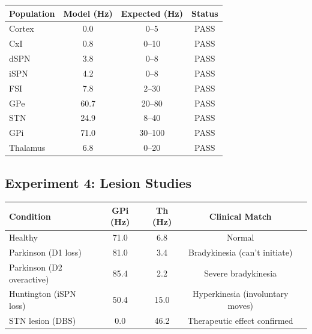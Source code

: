 \documentclass[11pt,a4paper]{article}
\begin{document}
\begin{table}[h]
\centering
\begin{tabular}{lccc}
\toprule
Population & Model (Hz) & Expected (Hz) & Status \\
\midrule
Cortex & 0.0 & 0--5 & PASS \\
CxI & 0.8 & 0--10 & PASS \\
dSPN & 3.8 & 0--8 & PASS \\
iSPN & 4.2 & 0--8 & PASS \\
FSI & 7.8 & 2--30 & PASS \\
GPe & 60.7 & 20--80 & PASS \\
STN & 24.9 & 8--40 & PASS \\
GPi & 71.0 & 30--100 & PASS \\
Thalamus & 6.8 & 0--20 & PASS \\
\bottomrule
\end{tabular}
\end{table}

\subsection{Experiment 4: Lesion Studies}

\begin{table}[h]
\centering
\begin{tabular}{lcccl}
\toprule
Condition & GPi (Hz) & Th (Hz) & Clinical Match \\
\midrule
Healthy & 71.0 & 6.8 & Normal \\
Parkinson (D1 loss) & 81.0 & 3.4 & Bradykinesia (can't initiate) \\
Parkinson (D2 overactive) & 85.4 & 2.2 & Severe bradykinesia \\
Huntington (iSPN loss) & 50.4 & 15.0 & Hyperkinesia (involuntary moves) \\
STN lesion (DBS) & 0.0 & 46.2 & Therapeutic effect confirmed \\
\bottomrule
\end{tabular}
\end{table}
\end{document}
